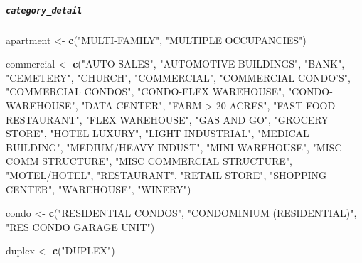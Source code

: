 \documentclass[]{article}
\newenvironment{Shaded}{\begin{snugshade}}{\end{snugshade}}
\newcommand{\KeywordTok}[1]{\textcolor[rgb]{0.13,0.29,0.53}{\textbf{#1}}}
\newcommand{\StringTok}[1]{\textcolor[rgb]{0.31,0.60,0.02}{#1}}
\newcommand{\NormalTok}[1]{#1}
\let\oldsubparagraph\subparagraph
\renewcommand{\subparagraph}[1]{\oldsubparagraph{#1}\mbox{}}
\begin{document}
\subparagraph{\texorpdfstring{\texttt{category\_detail}}{category\_detail}}\label{category_detail}

\begin{Shaded}
\begin{Highlighting}[]
\NormalTok{apartment <-}\StringTok{ }\KeywordTok{c}\NormalTok{(}\StringTok{"MULTI-FAMILY"}\NormalTok{,}
               \StringTok{"MULTIPLE OCCUPANCIES"}\NormalTok{)}

\NormalTok{commercial <-}\StringTok{ }\KeywordTok{c}\NormalTok{(}\StringTok{"AUTO SALES"}\NormalTok{,}
                \StringTok{"AUTOMOTIVE BUILDINGS"}\NormalTok{,}
                \StringTok{"BANK"}\NormalTok{,}
                \StringTok{"CEMETERY"}\NormalTok{,}
                \StringTok{"CHURCH"}\NormalTok{,}
                \StringTok{"COMMERCIAL"}\NormalTok{,}
                \StringTok{"COMMERCIAL CONDO'S"}\NormalTok{,}
                \StringTok{"COMMERCIAL CONDOS"}\NormalTok{,}
                \StringTok{"CONDO-FLEX WAREHOUSE"}\NormalTok{,}
                \StringTok{"CONDO-WAREHOUSE"}\NormalTok{,}
                \StringTok{"DATA CENTER"}\NormalTok{,}
                \StringTok{"FARM > 20 ACRES"}\NormalTok{,}
                \StringTok{"FAST FOOD RESTAURANT"}\NormalTok{,}
                \StringTok{"FLEX WAREHOUSE"}\NormalTok{,}
                \StringTok{"GAS AND GO"}\NormalTok{,}
                \StringTok{"GROCERY STORE"}\NormalTok{,}
                \StringTok{"HOTEL LUXURY"}\NormalTok{,}
                \StringTok{"LIGHT INDUSTRIAL"}\NormalTok{,}
                \StringTok{"MEDICAL BUILDING"}\NormalTok{,}
                \StringTok{"MEDIUM/HEAVY INDUST"}\NormalTok{,}
                \StringTok{"MINI WAREHOUSE"}\NormalTok{,}
                \StringTok{"MISC COMM STRUCTURE"}\NormalTok{,}
                \StringTok{"MISC COMMERCIAL STRUCTURE"}\NormalTok{,}
                \StringTok{"MOTEL/HOTEL"}\NormalTok{,}
                \StringTok{"RESTAURANT"}\NormalTok{,}
                \StringTok{"RETAIL STORE"}\NormalTok{,}
                \StringTok{"SHOPPING CENTER"}\NormalTok{, }
                \StringTok{"WAREHOUSE"}\NormalTok{,}
                \StringTok{"WINERY"}\NormalTok{)}

\NormalTok{condo <-}\StringTok{ }\KeywordTok{c}\NormalTok{(}\StringTok{"RESIDENTIAL CONDOS"}\NormalTok{,}
           \StringTok{"CONDOMINIUM (RESIDENTIAL)"}\NormalTok{,}
           \StringTok{"RES CONDO GARAGE UNIT"}\NormalTok{)}

\NormalTok{duplex <-}\StringTok{ }\KeywordTok{c}\NormalTok{(}\StringTok{"DUPLEX"}\NormalTok{)}


\end{Highlighting}
\end{Shaded}
\end{document}
